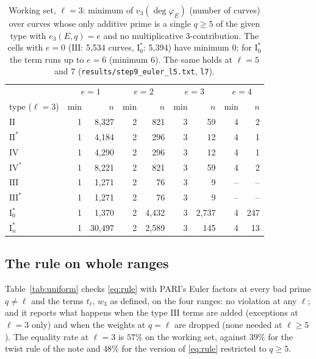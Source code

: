 \documentclass[11pt]{amsart}
\theoremstyle{definition}
\newcommand{\degphi}{\deg\varphi_E}\newcommand{\Gal}{\operatorname{Gal}}\newcommand{\ad}{\operatorname{ad}^0}
\begin{document}
\begin{table}[ht]\centering\footnotesize
\begin{tabular}{l rr rr rr rr}
\toprule
 & \multicolumn{2}{c}{$e=1$} & \multicolumn{2}{c}{$e=2$} & \multicolumn{2}{c}{$e=3$} & \multicolumn{2}{c}{$e=4$}\\
type ($\ell=3$) & min & $n$ & min & $n$ & min & $n$ & min & $n$\\
\midrule
$\mathrm{II}$ & 1 & 8,327 & 2 & 821 & 3 & 59 & 4 & 2\\
$\mathrm{II}^*$ & 1 & 4,184 & 2 & 296 & 3 & 12 & 4 & 1\\
$\mathrm{IV}$ & 1 & 4,290 & 2 & 296 & 3 & 12 & 4 & 1\\
$\mathrm{IV}^*$ & 1 & 8,221 & 2 & 821 & 3 & 59 & 4 & 2\\
$\mathrm{III}$ & 1 & 1,271 & 2 & 76 & 3 & 9 & -- & --\\
$\mathrm{III}^*$ & 1 & 1,271 & 2 & 76 & 3 & 9 & -- & --\\
$\mathrm{I}_0^*$ & 1 & 1,370 & 2 & 4,432 & 3 & 2,737 & 4 & 247\\
$\mathrm{I}_n^*$ & 1 & 30,497 & 2 & 2,589 & 3 & 145 & 4 & 13\\
\bottomrule
\end{tabular}
\caption{Working set, $\ell=3$: minimum of $v_3(\degphi)$ (number of curves) over curves whose only additive prime is a single $q\ge5$ of the given type with $e_3(E,q)=e$ and no multiplicative $3$-contribution. The cells with $e=0$ ($\mathrm{III}$: 5,534 curves, $\mathrm{I}_0^*$: 5,394) have minimum $0$; for $\mathrm{I}_0^*$ the term runs up to $e=6$ (minimum $6$). The same holds at $\ell=5$ and $7$ (\texttt{results/step9\_euler\_l5.txt}, \texttt{l7}).}\label{tab:iso}
\end{table}

\subsection{The rule on whole ranges}
Table~\ref{tab:uniform} checks \eqref{eq:rule} with PARI's Euler factors at every bad prime $q\ne\ell$ and the terms $t_\ell$, $w_3$ as defined, on the four ranges: no violation at any $\ell$; and it reports what happens when the type $\mathrm{III}$ terms are added (exceptions at $\ell=3$ only) and when the weights at $q=\ell$ are dropped (none needed at $\ell\ge5$). The equality rate at $\ell=3$ is $57\%$ on the working set, against $39\%$ for the twist rule of the note and $48\%$ for the version of \eqref{eq:rule} restricted to $q\ge5$.
\end{document}

